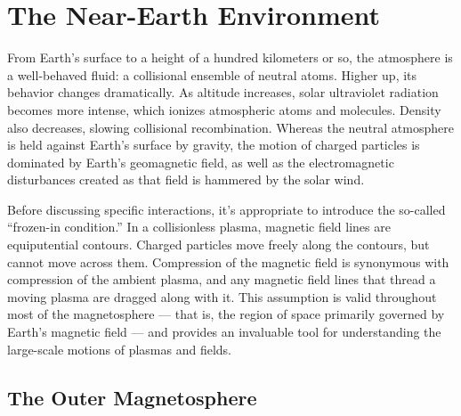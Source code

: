


\chapter{The Near-Earth Environment}
  \label{ch_environment}


From Earth's surface to a height of a hundred kilometers or so, the atmosphere is a well-behaved fluid: a collisional ensemble of neutral atoms. Higher up, its behavior changes dramatically. As altitude increases, solar ultraviolet radiation becomes more intense, which ionizes atmospheric atoms and molecules. Density also decreases, slowing collisional recombination. Whereas the neutral atmosphere is held against Earth's surface by gravity, the motion of charged particles is dominated by Earth's geomagnetic field, as well as the electromagnetic disturbances created as that field is hammered by the solar wind. 

Before discussing specific interactions, it's appropriate to introduce the so-called ``frozen-in condition.'' In a collisionless plasma, magnetic field lines are equiputential contours. Charged particles move freely along the contours, but cannot move across them. Compression of the magnetic field is synonymous with compression of the ambient plasma, and any magnetic field lines that thread a moving plasma are dragged along with it. This assumption is valid throughout most of the magnetosphere --- that is, the region of space primarily governed by Earth's magnetic field --- and provides an invaluable tool for understanding the large-scale motions of plasmas and fields. 


\section{The Outer Magnetosphere}
  \label{sec_outer}

